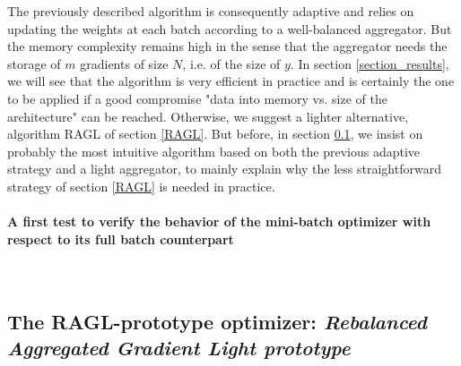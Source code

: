 The previously described algorithm is consequently adaptive and relies on updating the weights at each batch according to a well-balanced aggregator. 
But the memory complexity remains high in the sense that the aggregator needs the storage of $m$ gradients of size $N$, i.e. of the size of $y$. In section \ref{section_results},
we will see that the algorithm is very efficient in practice and is certainly 
the one to be applied if a good compromise "data into memory vs. size of the architecture" can be reached. Otherwise, we suggest a lighter alternative, algorithm RAGL of section
\ref{RAGL}. 
But before, in section \ref{RAGL_proto}, we insist on probably the most intuitive algorithm based on both the previous adaptive strategy and a light aggregator, to mainly 
explain why the less straightforward strategy of section \ref{RAGL} is needed in practice. 


\paragraph{A first test to verify the behavior of the mini-batch optimizer with respect to its full batch counterpart}
\ \\

\subsection{{The RAGL-prototype optimizer: {\it Rebalanced Aggregated Gradient Light prototype}}}
\label{RAGL_proto}


